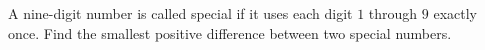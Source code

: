 A nine-digit number is called special if it uses each digit $1$ through $9$ exactly once. Find the smallest positive difference between two special numbers.
